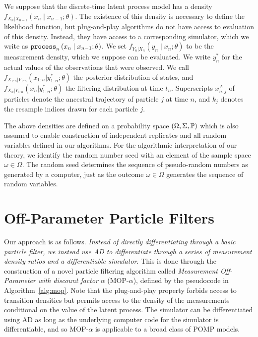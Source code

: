 \documentclass[9pt,twocolumn,pnasresearcharticle]{pnas-new}
\newcommand\arxiv[2]{#2} %
\begin{document}
We suppose that the discete-time latent process model has a density $f_{X_n|X_{n-1}}\left(x_{n} \mid x_{n-1}; \theta\right)$.
The existence of this density is necessary to define the likelihood function, but plug-and-play algorithms do not have access to evaluation of this density.
Instead, they have access to a corresponding simulator, which we write as $\texttt{process}_n\left(x_n\mid x_{n-1}; \theta\right)$.
We set $f_{Y_n|X_n}\left(y_n \mid x_n; \theta\right)$ to be the measurement density, which we suppose can be evaluated. We write $y_n^*$ for the actual values of the observations that were observed.
We call $f_{X_{1:n}|Y_{1:n}}(x_{1:n}|y_{1:n}^*; \theta)$ the posterior distribution of states, and $f_{X_{n}|Y_{1:n}}(x_n|y_{1:n}^*; \theta)$ the filtering distribution at time $t_n$.
Superscripts $x_{n,j}^A$ of particles denote the ancestral trajectory of particle $j$ at time $n$,  and $k_j$
denotes the resample indices drawn for each particle $j$. 

The above densities are defined on a probability space $(\Omega, \Sigma, \mathbb{P})$ which is also assumed to enable construction of independent replicates and all random variables defined in our algorithms.
For the algorithmic interpretation of our theory, we identify the random number seed with an element of the sample space $\omega \in \Omega$. The random seed determines the sequence of pseudo-random numbers as generated by a computer, just as the outcome $\omega\in\Omega$ generates the sequence of random variables.


\arxiv{}{\vspace*{-2mm}}
\section{Off-Parameter Particle Filters}

Our approach is as follows. \textit{Instead of directly differentiating through a basic particle filter, we instead use AD to differentiate through a series of measurement density ratios and a differentiable simulator}. 
This is done through the construction of a novel particle filtering algorithm called {\it Measurement Off-Parameter with discount factor} $\alpha$ (MOP-$\alpha$), defined by the pseudocode in Algorithm~\ref{alg:mop}.
Note that the plug-and-play property forbids access to transition densities but permits access to the density of the measurements conditional on the value of the latent process.
The simulator can be differentiated using AD as long as the underlying computer code for the simulator is differentiable, and so MOP-$\alpha$ is applicable to a broad class of POMP models.
\end{document}
